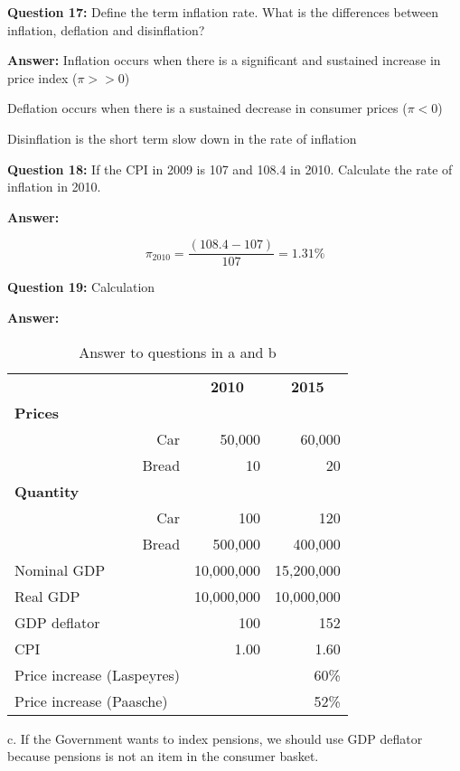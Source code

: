 \documentclass[a4paper, 11pt]{article}
\begin{document}
\textbf{Question 17:} Define the term inflation rate. What is the differences between inflation, deflation and disinflation?

\textbf{Answer:} 
Inflation occurs when there is a significant and sustained increase in price index ($\pi>>0$)

Deflation occurs when there is a sustained decrease in consumer prices ($\pi<0$)

Disinflation is the short term slow down in the rate of inflation

\textbf{Question 18:} If the CPI in 2009 is 107 and 108.4 in 2010. Calculate the rate of inflation in 2010.

\textbf{Answer:} 

$$ \pi_{2010} = \frac{(108.4 - 107)}{107} = 1.31\%$$

\textbf{Question 19:} Calculation 

\textbf{Answer:} 
\begin{table}[htbp]
  \centering
  \caption{Answer to questions in a and b}
    \begin{tabular}{lrr}
    \toprule
    \toprule
          & \multicolumn{1}{c}{\textbf{2010}} & \multicolumn{1}{c}{\textbf{2015}} \\
    \textbf{Prices} &       &  \\
    \multicolumn{1}{r}{Car} &                           50,000    &            60,000    \\
    \multicolumn{1}{r}{Bread} &                                  10    &                    20    \\
    \textbf{Quantity} &       &  \\
    \multicolumn{1}{r}{Car} &                                100    &                  120    \\
    \multicolumn{1}{r}{Bread} &                        500,000    &          400,000    \\
    \midrule
    Nominal GDP &                   10,000,000    &    15,200,000    \\
    Real GDP &                   10,000,000    &    10,000,000    \\
    GDP deflator &                                100    &                  152    \\
    CPI   &                               1.00    &                1.60    \\
    Price increase (Laspeyres) &       & 60\% \\
    Price increase (Paasche) &       & 52\% \\
    \bottomrule
    \end{tabular}%
 
c. If the Government wants to index pensions, we should use GDP deflator because pensions is not an item in the consumer basket.
\end{table}%
\end{document}
